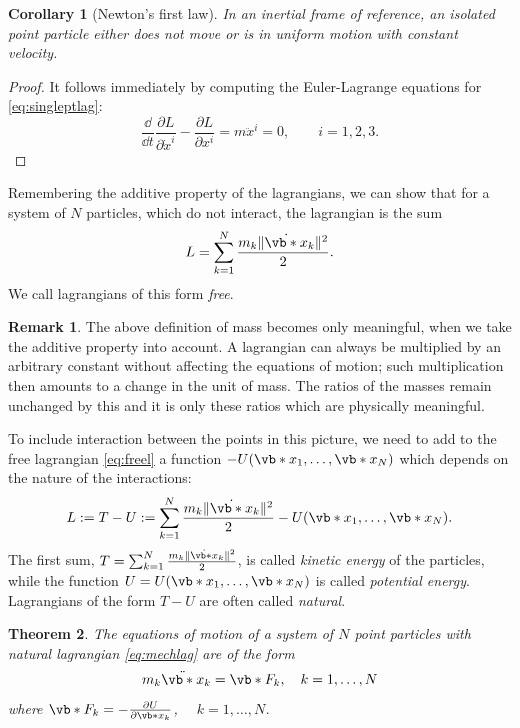 \documentclass[english,fontsize=11pt,paper=b5]{scrbook}
\newtheorem{theorem}{Theorem}[chapter]
\newtheorem{corollary}[theorem]{Corollary}
\theoremstyle{definition}
\newtheorem{remark}{Remark}[chapter]
\begin{document}
    \begin{corollary}[Newton's first law]
      In an inertial frame of reference, an isolated point particle either does not move or is in uniform motion with constant velocity.
    \end{corollary}
    \begin{proof}
      It follows immediately by computing the Euler-Lagrange equations for \eqref{eq:singleptlag}:
      \begin{equation}
        \frac{\dd}{\dd t} \frac{\partial L}{\partial \dot x^i} - \frac{\partial L}{\partial x^i} = m \ddot x^i = 0, \qquad i=1,2,3.
      \end{equation}
    \end{proof}

    Remembering the additive property of the lagrangians, we can show that for a system of $N$ particles, which do not interact, the lagrangian is the sum
    \begin{equation}\label{eq:freel}
      L = \sum_{k=1}^N \frac{m_k \|\dot{\vb*{x}}_k\|^2}{2}.
    \end{equation}
    We call lagrangians of this form \emph{free}.

    \begin{remark}
      The above definition of mass becomes only meaningful, when we take the additive property into account.
      A lagrangian can always be multiplied by an arbitrary constant without affecting the equations of motion;
      such multiplication then amounts to a change in the unit of mass.
      The ratios of the masses remain unchanged by this and it is only these ratios which are physically meaningful.
    \end{remark}

    To include interaction between the points in this picture, we need to add to the free lagrangian \eqref{eq:freel} a function $-U(\vb*{x}_1, \ldots, \vb*{x}_N)$ which depends on the nature of the interactions:
    \begin{equation}\label{eq:mechlag}
      L := T-U := \sum_{k=1}^N \frac{m_k \|\dot{\vb*{x}}_k\|^2}{2} -U(\vb*{x}_1, \ldots, \vb*{x}_N).
    \end{equation}
    The first sum, $T = \sum_{k=1}^N \frac{m_k \|\dot{\vb*{x}}_k\|^2}{2}$, is called \emph{kinetic energy} of the particles, while the function $U = U(\vb*{x}_1, \ldots, \vb*{x}_N)$ is called \emph{potential energy}. Lagrangians of the form $T-U$ are often called \emph{natural}.

    \begin{theorem}
      The equations of motion of a system of $N$ point particles with natural lagrangian \eqref{eq:mechlag} are of the form
      \begin{equation}\label{eq:newton2}
        m_k \ddot{\vb*{x}}_k = \vb*{F}_k, \quad k=1,\ldots,N
      \end{equation}
      where $\vb*{F}_k = -\frac{\partial U}{\partial \vb*{x}_k}$, $\quad k=1,\ldots,N$.
    \end{theorem}
\end{document}
